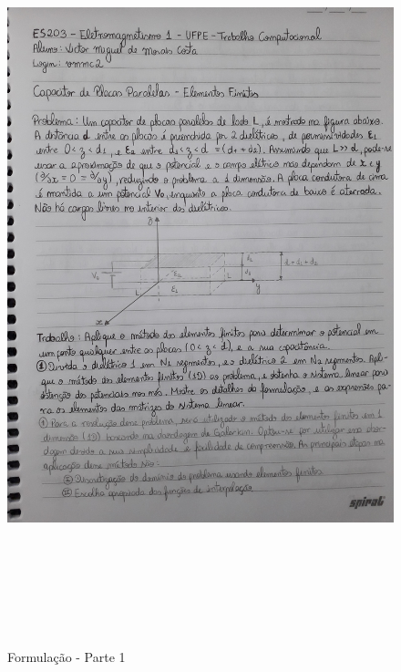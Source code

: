 \documentclass[10pt]{article}
\begin{document}
    
    \begin{figure}[!htb]
    \centerline{\includegraphics[width=20cm,height=22cm]{Formulação Matemática/Formulacao - Parte 1.jpg}}
    \caption{Formulação - Parte 1}
    \label{fig:fp1}
    \end{figure}
    
\end{document}

